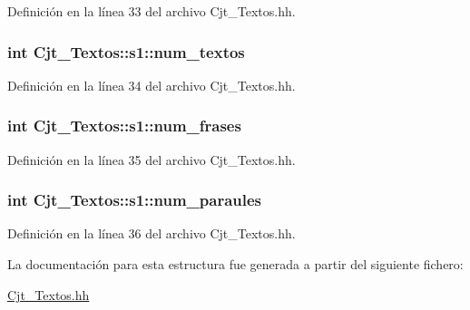 Definición en la línea 33 del archivo Cjt\+\_\+\+Textos.\+hh.

\subsubsection[{\texorpdfstring{num\+\_\+textos}{num_textos}}]{\setlength{\rightskip}{0pt plus 5cm}int Cjt\+\_\+\+Textos\+::s1\+::num\+\_\+textos}\hypertarget{struct_cjt___textos_1_1s1_a789a5da8fd97cdc9886e86f9dff2c78d}{}\label{struct_cjt___textos_1_1s1_a789a5da8fd97cdc9886e86f9dff2c78d}


Definición en la línea 34 del archivo Cjt\+\_\+\+Textos.\+hh.

\subsubsection[{\texorpdfstring{num\+\_\+frases}{num_frases}}]{\setlength{\rightskip}{0pt plus 5cm}int Cjt\+\_\+\+Textos\+::s1\+::num\+\_\+frases}\hypertarget{struct_cjt___textos_1_1s1_ab80e729ee8a8b08fd82b1c0bc49c3111}{}\label{struct_cjt___textos_1_1s1_ab80e729ee8a8b08fd82b1c0bc49c3111}


Definición en la línea 35 del archivo Cjt\+\_\+\+Textos.\+hh.

\subsubsection[{\texorpdfstring{num\+\_\+paraules}{num_paraules}}]{\setlength{\rightskip}{0pt plus 5cm}int Cjt\+\_\+\+Textos\+::s1\+::num\+\_\+paraules}\hypertarget{struct_cjt___textos_1_1s1_a38e9176fac44a1ef7e12101c0089a804}{}\label{struct_cjt___textos_1_1s1_a38e9176fac44a1ef7e12101c0089a804}


Definición en la línea 36 del archivo Cjt\+\_\+\+Textos.\+hh.



La documentación para esta estructura fue generada a partir del siguiente fichero\+:\begin{DoxyCompactItemize}
\item 
\hyperlink{_cjt___textos_8hh}{Cjt\+\_\+\+Textos.\+hh}\end{DoxyCompactItemize}
